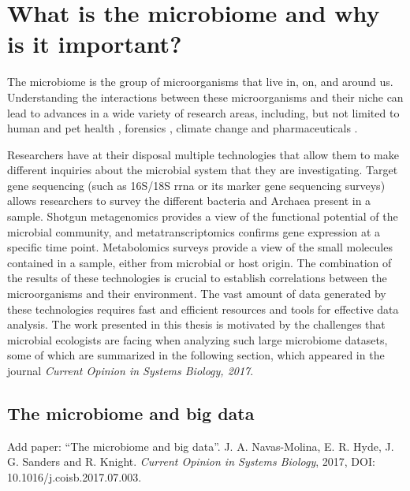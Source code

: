 \documentclass[12pt,chapterheads]{ucsd}
\begin{document}
%




\chapter{What is the microbiome and why is it important?}\label{chapter_overview}
\glsresetall

The microbiome is the group of microorganisms that live in, on, and around us.
Understanding the interactions between these microorganisms and their niche can
lead to advances in a wide variety of research areas, including, but not limited
to human and pet health \cite{Cox2015, Gevers2014, Vazquez-Baeza2016}, forensics
\cite{Fierer2010, Hyde2017}, climate change \cite{Tas2014} and pharmaceuticals
\cite{Novo2000, Maurice2013}.

Researchers have at their disposal multiple technologies that allow them to make
different inquiries about the microbial system that they are investigating.
Target gene sequencing (such as 16S/18S \gls{rrna} or \gls{its} marker gene
sequencing surveys) allows researchers to survey the different bacteria and
Archaea present in a sample. Shotgun metagenomics provides a view of the functional
potential of the microbial community, and metatranscriptomics confirms gene
expression at a specific time point. Metabolomics surveys provide a view of
the small molecules contained in a sample, either from microbial or host origin.
The combination of the results of these technologies is crucial to establish
correlations between the microorganisms and their environment. The vast amount
of data generated by these technologies requires fast and efficient resources
and tools for effective data analysis. The work presented in this thesis is
motivated by the challenges that microbial ecologists are facing when analyzing
such large microbiome datasets, some of which are summarized in the following
section, which appeared in the journal \textsl{Current Opinion in Systems Biology, 2017}.

% 
\section{The microbiome and big data}\label{section_bigdata}
Add paper: ``The microbiome and big data''. J. A. Navas-Molina, E. R. Hyde, J. G. Sanders and R. Knight. \emph{Current Opinion in Systems Biology}, 2017, DOI: 10.1016/j.coisb.2017.07.003.
\end{document}
